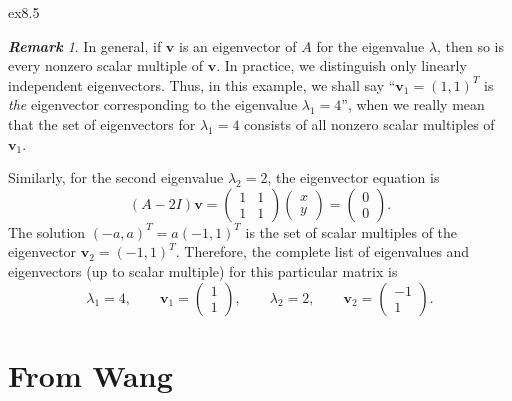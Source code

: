 \documentclass[12pt]{article}
\theoremstyle{remark}
\newtheorem*{remark}{\textbf{Remark}}
\begin{document}
\begin{example}{}{ex8.5}
\begin{remark}
    In general, if $\mathbf{v}$ is an eigenvector of $A$ for the eigenvalue $\lambda$, then so is every nonzero scalar multiple of $\mathbf{v}$. In practice, we distinguish only linearly independent eigenvectors. Thus, in this example, we shall say ``$\mathbf{v}_1=(1,1)^T$ is \emph{the} eigenvector corresponding to the eigenvalue $\lambda_1=4$'', when we really mean that the set of eigenvectors for $\lambda_1 = 4$ consists of all nonzero scalar multiples of $\mathbf{v}_1$.
\end{remark}

Similarly, for the second eigenvalue $\lambda_2 = 2$, the eigenvector equation is
\begin{equation*}
    (A-2I)\mathbf{v}=\begin{pmatrix}1 & 1 \\ 1 & 1\end{pmatrix} \begin{pmatrix}x\\y\end{pmatrix} = \begin{pmatrix}0\\0\end{pmatrix}.
\end{equation*}
The solution $(-a,a)^T=a(-1,1)^T$ is the set of scalar multiples of the eigenvector $\mathbf{v}_2 = (-1,1)^T$. Therefore, the complete list of eigenvalues and eigenvectors (up to scalar multiple) for this particular matrix is
\begin{equation*}
    \lambda_1=4,\qquad \mathbf{v}_1 = \begin{pmatrix}1\\1\end{pmatrix}, \qquad \lambda_2 = 2, \qquad \mathbf{v}_2 = \begin{pmatrix}-1\\1\end{pmatrix}.
\end{equation*}
\end{example}
\section*{From Wang}
\end{document}

